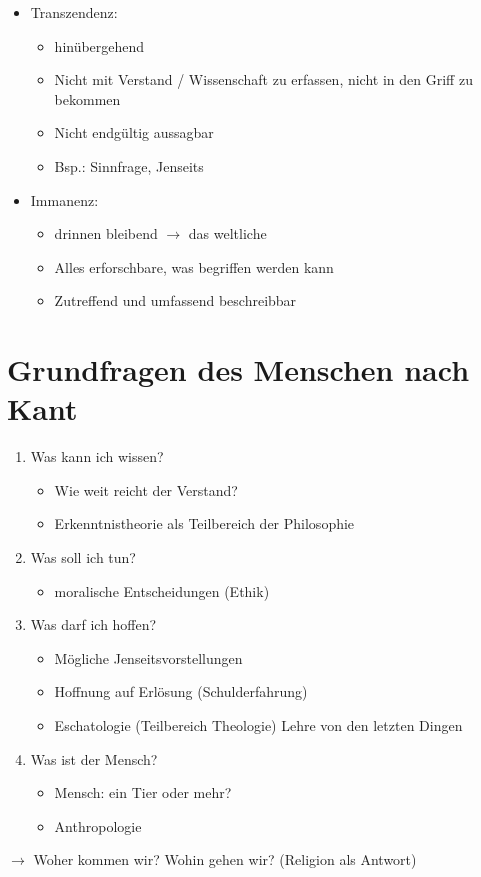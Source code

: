 \documentclass[11pt, paper=a4, twocolumn]{scrartcl}
\begin{document}
	\begin{itemize}
		\item Transzendenz:
			\begin{itemize}
				\item \glqq{}hinübergehend\grqq{}
				\item Nicht mit Verstand / Wissenschaft zu erfassen, nicht in den Griff zu bekommen
				\item Nicht endgültig aussagbar
				\item Bsp.: Sinnfrage, Jenseits
			\end{itemize}
		\item Immanenz:
			\begin{itemize}
				\item \glqq{}drinnen bleibend\grqq{} $\rightarrow$ das \glqq{}weltliche\grqq{}
				\item Alles erforschbare, was begriffen werden kann
				\item Zutreffend und umfassend beschreibbar
			\end{itemize}
	\end{itemize}

	\section{Grundfragen des Menschen nach Kant}

	\begin{enumerate}
		\item Was kann ich wissen?
			\begin{itemize}
				\item Wie weit reicht der Verstand?
				\item Erkenntnistheorie als Teilbereich der Philosophie
			\end{itemize}
		\item Was soll ich tun?
			\begin{itemize}
				\item moralische Entscheidungen (Ethik)
			\end{itemize}
		\item Was darf ich hoffen?
			\begin{itemize}
				\item Mögliche Jenseitsvorstellungen
				\item Hoffnung auf Erlösung (Schulderfahrung)
				\item Eschatologie (Teilbereich Theologie) Lehre von den letzten Dingen
			\end{itemize}
		\item Was ist der Mensch?
			\begin{itemize}
				\item Mensch: ein Tier oder mehr?
				\item Anthropologie
			\end{itemize}
	\end{enumerate}
	$\rightarrow$ Woher kommen wir? Wohin gehen wir? (Religion als Antwort)
\end{document}
